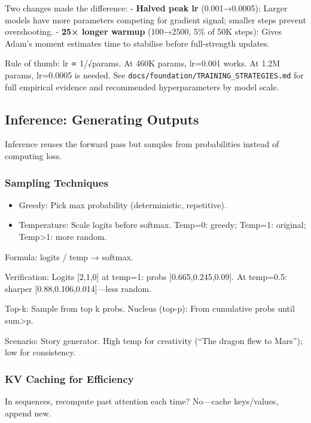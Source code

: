 \documentclass[
]{article}
\providecommand{\tightlist}{%
  \setlength{\itemsep}{0pt}\setlength{\parskip}{0pt}}
\begin{document}
Two changes made the difference: - \textbf{Halved peak lr}
(0.001→0.0005): Larger models have more parameters competing for
gradient signal; smaller steps prevent overshooting. - \textbf{25×
longer warmup} (100→2500, 5\% of 50K steps): Gives Adam's moment
estimates time to stabilise before full-strength updates.

Rule of thumb: lr ∝ 1/√params. At 460K params, lr=0.001 works. At 1.2M
params, lr=0.0005 is needed. See
\texttt{docs/foundation/TRAINING\_STRATEGIES.md} for full empirical
evidence and recommended hyperparameters by model scale.

\subsection{Inference: Generating
Outputs}\label{inference-generating-outputs}

Inference reuses the forward pass but samples from probabilities instead
of computing loss.

\subsubsection{Sampling Techniques}\label{sampling-techniques}

\begin{itemize}
\tightlist
\item
  Greedy: Pick max probability (deterministic, repetitive).
\item
  Temperature: Scale logits before softmax. Temp=0: greedy; Temp=1:
  original; Temp\textgreater1: more random.
\end{itemize}

Formula: logits / temp → softmax.

Verification: Logits {[}2,1,0{]} at temp=1: probs
{[}0.665,0.245,0.09{]}. At temp=0.5: sharper
{[}0.88,0.106,0.014{]}---less random.

Top-k: Sample from top k probs. Nucleus (top-p): From cumulative probs
until sum\textgreater p.

Scenario: Story generator. High temp for creativity (``The dragon flew
to Mars''); low for consistency.

\subsubsection{KV Caching for
Efficiency}\label{kv-caching-for-efficiency}

In sequences, recompute past attention each time? No---cache
keys/values, append new.
\end{document}
